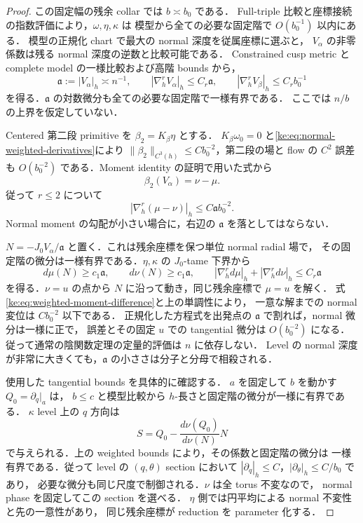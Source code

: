 \begin{proof}
この固定幅の残余 collar では $b\asymp b_0$ である．
Full-triple 比較と座標接続の指数評価により，$\omega,\eta,\kappa$ は
模型から全ての必要な固定階で $O(b_0^{-1})$ 以内にある．
模型の正規化 chart で最大の normal 深度を従属座標に選ぶと，
$V_\alpha$ の非零係数は残る normal 深度の逆数と比較可能である．
Constrained cusp metric と complete model の一様比較および高階 bounds から，
\begin{equation}\label{ke:eq:normal-weighted-derivatives}
 \mathfrak a:=|V_\alpha|_h\asymp n^{-1},\qquad
 |\nabla_h^rV_\alpha|_h\le C_r\mathfrak a,
 \qquad |\nabla_h^rV_\beta|_h\le C_r b_0^{-1}
\end{equation}
を得る．$\mathfrak a$ の対数微分も全ての必要な固定階で一様有界である．
ここでは $n/b$ の上界を仮定していない．

Centered 第二段 primitive を $\beta_2=K_\beta\eta$ とする．
$K_\beta\omega_0=0$ と\eqref{ke:eq:normal-weighted-derivatives}により
$\|\beta_2\|_{C^3(h)}\le Cb_0^{-2}$，第二段の場と flow の $C^2$ 誤差も
$O(b_0^{-2})$ である．Moment identity の証明で用いた式から
\[
 \beta_2(V_\alpha)=\nu-\mu.
\]
従って $r\le2$ について
\begin{equation}\label{ke:eq:weighted-moment-difference}
 |\nabla_h^r(\mu-\nu)|_h\le C\mathfrak a b_0^{-2}.
\end{equation}
Normal moment の勾配が小さい場合に，右辺の $\mathfrak a$ を落としてはならない．

$N=-J_0V_\alpha/\mathfrak a$ と置く．これは残余座標を保つ単位 normal radial 場で，
その固定階の微分は一様有界である．$\eta,\kappa$ の $J_0$-tame 下界から
\[
 d\mu(N)\ge c_1\mathfrak a,\qquad
 d\nu(N)\ge c_1\mathfrak a,
 \qquad |\nabla_h^r d\mu|_h+|\nabla_h^r d\nu|_h\le C_r\mathfrak a
\]
を得る．$\nu=u$ の点から $N$ に沿って動き，同じ残余座標で $\mu=u$ を解く．
式\eqref{ke:eq:weighted-moment-difference}と上の単調性により，
一意な解までの normal 変位は $Cb_0^{-2}$ 以下である．
正規化した方程式を出発点の $\mathfrak a$ で割れば，normal 微分は一様に正で，
誤差とその固定 $u$ での tangential 微分は $O(b_0^{-2})$ になる．
従って通常の陰関数定理の定量的評価は $n$ に依存しない．
Level の normal 深度が非常に大きくても，$\mathfrak a$ の小ささは分子と分母で相殺される．

使用した tangential bounds を具体的に確認する．
$a$ を固定して $b$ を動かす $Q_0=\partial_q|_a$ は，
$b\le c$ と模型比較から $h$-長さと固定階の微分が一様に有界である．
$\kappa$ level 上の $q$ 方向は
\[
 S=Q_0-\frac{d\nu(Q_0)}{d\nu(N)}N
\]
で与えられる．上の weighted bounds により，その係数と固定階の微分は
一様有界である．従って level の $(q,\theta)$ section において
$|\partial_q|_h\le C$，$|\partial_\theta|_h\le C/b_0$ であり，
必要な微分も同じ尺度で制御される．$\nu$ は全 torus 不変なので，
normal phase を固定してこの section を選べる．
$\eta$ 側では円平均による normal 不変性と先の一意性があり，
同じ残余座標が reduction を parameter 化する．


\end{proof}
